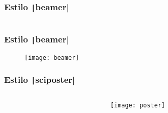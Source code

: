\begin{frame}[fragile]
	\frametitle{Estilo \texttt|beamer|}

	\inputminted[firstline=1,lastline=45,fontsize=\tiny,linenos,frame=single,escapeinside=||]{latex}{beamer} %
\end{frame}

\begin{frame}
	\frametitle{Estilo \texttt|beamer|}

	\begin{figure}[ht!]
		\centering
		\texttt{[image: beamer]}
	\end{figure}
\end{frame}

\begin{frame}[fragile]
	\frametitle{Estilo \texttt|sciposter|}

	\begin{columns}
		\begin{column}{.6\paperwidth}
			\inputminted[fontsize=\tiny,linenos,frame=single,escapeinside=||]{latex}{poster} %
		\end{column}
		\pause
		\begin{column}{.36\paperwidth}
			\begin{figure}[ht!]
				\centering
				\texttt{[image: poster]}
			\end{figure}
		\end{column}
	\end{columns}
\end{frame}
